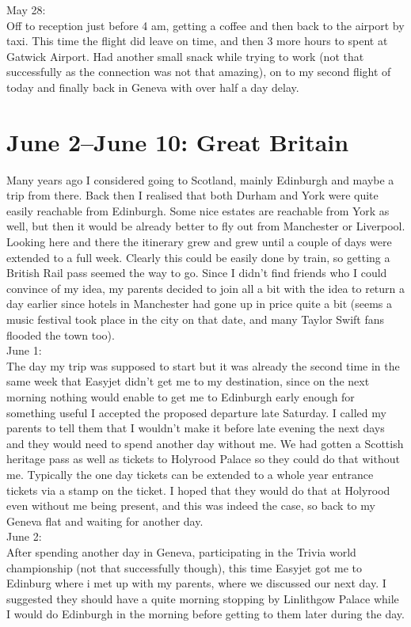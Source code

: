 May 28:\\
Off to reception just before 4 am, getting a coffee and then back to the airport by taxi. This time the flight did leave on time, and then 3 more hours to spent at Gatwick Airport. Had another small snack while trying to work (not that successfully as the connection was not that amazing), on to my second flight of today and finally back in Geneva with over half a day delay.

\section{June 2--June 10: Great Britain}
\label{UK2018}

Many years ago I considered going to Scotland, mainly Edinburgh and maybe a trip from there. Back then I realised that both Durham and York were quite easily reachable from Edinburgh. Some nice estates are reachable from York as well, but then it would be already better to fly out from Manchester or Liverpool. Looking here and there the itinerary grew and grew until a couple of days were extended to a full week. Clearly this could be easily done by train, so getting a British Rail pass seemed the way to go. Since I didn't find friends who I could convince of my idea, my parents decided to join all a bit with the idea to return a day earlier since hotels in Manchester had gone up in price quite a bit (seems a music festival took place in the city on that date, and many Taylor Swift fans flooded the town too).\\

June 1:\\
The day my trip was supposed to start but it was already the second time in the same week that Easyjet didn't get me to my destination, since on the next morning nothing would enable to get me to Edinburgh early enough for something useful I accepted the proposed departure late Saturday. I called my parents to tell them that I wouldn't make it before late evening the next days and they would need to spend another day without me. We had gotten a Scottish heritage pass as well as tickets to Holyrood Palace so they could do that without me. Typically the one day tickets can be extended to a whole year entrance tickets via a stamp on the ticket. I hoped that they would do that at Holyrood even without me being present, and this was indeed the case, so back to my Geneva flat and waiting for another day.\\

June 2:\\
After spending another day in Geneva, participating in the Trivia world championship (not that successfully though), this time Easyjet got me to Edinburg where i met up with my parents, where we discussed our next day. I suggested they should have a quite morning stopping by Linlithgow Palace while I would do Edinburgh in the morning before getting to them later during the day.\\

